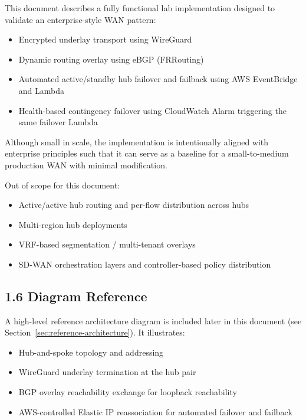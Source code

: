 \documentclass[11pt]{article}
\begin{document}
This document describes a fully functional lab implementation designed to validate an enterprise-style WAN pattern:

\begin{itemize}
  \item Encrypted underlay transport using WireGuard
  \item Dynamic routing overlay using eBGP (FRRouting)
  \item Automated active/standby hub failover and failback using AWS EventBridge and Lambda
  \item Health-based contingency failover using CloudWatch Alarm triggering the same failover Lambda
\end{itemize}

Although small in scale, the implementation is intentionally aligned with enterprise principles such that it can serve as a baseline for a small-to-medium production WAN with minimal modification.

Out of scope for this document:

\begin{itemize}
  \item Active/active hub routing and per-flow distribution across hubs
  \item Multi-region hub deployments
  \item VRF-based segmentation / multi-tenant overlays
  \item SD-WAN orchestration layers and controller-based policy distribution
\end{itemize}

\subsection{1.6 Diagram Reference}
\label{sec:diagram-reference}

A high-level reference architecture diagram is included later in this document (see Section~\ref{sec:reference-architecture}). It illustrates:

\begin{itemize}
  \item Hub-and-spoke topology and addressing
  \item WireGuard underlay termination at the hub pair
  \item BGP overlay reachability exchange for loopback reachability
  \item AWS-controlled Elastic IP reassociation for automated failover and failback
\end{itemize}
\end{document}
